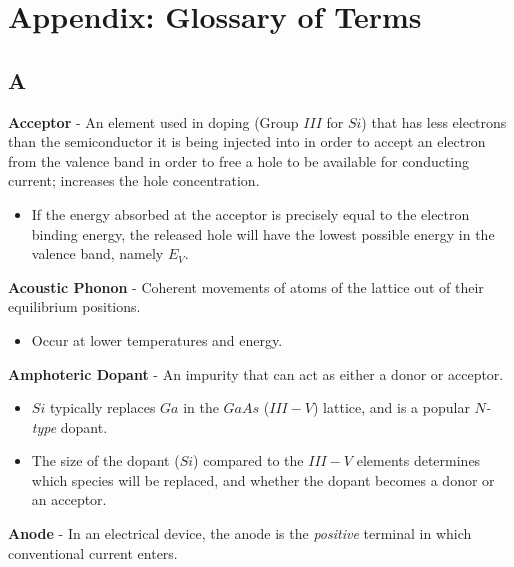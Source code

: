 \chapter{Appendix: Glossary of Terms}
\label{app:glossary}
\section{A}
    \textbf{Acceptor} - An element used in doping (Group $III$ for $Si$) that has less electrons than the semiconductor it is being injected into in order to accept an electron from the valence band in order to free a hole to be available for conducting current; increases the hole concentration.
    \vspace{0.15cm}
    \begin{itemize}
        \setlength\itemsep{0.5em}
        \item{If the energy absorbed at the acceptor is precisely equal to the electron binding energy, the released hole will have the lowest possible energy in the valence band, namely $E_V$.}
    \end{itemize}
\vspace{0.5cm}
    \textbf{Acoustic Phonon} - Coherent movements of atoms of the lattice out of their equilibrium positions.
    \vspace{0.15cm}
    \begin{itemize}
        \setlength\itemsep{0.5em}
        \item{Occur at lower temperatures and energy.}
    \end{itemize}
\vspace{0.5cm}
    \textbf{Amphoteric Dopant} - An impurity that can act as either a donor or acceptor.
    \vspace{0.15cm}
    \begin{itemize}
        \setlength\itemsep{0.5em}
        \item{$Si$ typically replaces $Ga$ in the $GaAs$ ($III-V$) lattice, and is a popular $N$\emph{-type} dopant.}
        \item{The size of the dopant ($Si$) compared to the $III-V$ elements determines which species will be replaced, and whether the dopant becomes a donor or an acceptor.}
    \end{itemize}
\vspace{0.5cm}
    \textbf{Anode} - In an electrical device, the anode is the \textit{positive} terminal in which conventional current enters.
    
